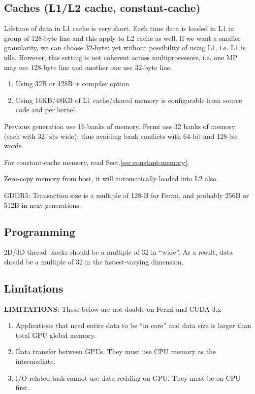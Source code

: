 \subsection{Caches (L1/L2 cache, constant-cache)}
\label{sec:caches}

Lifetime of data in L1 cache is very short. Each time data is loaded
in L1 in group of 128-byte line and this apply to L2 cache as well. If
we want a smaller granularity, we can choose 32-byte; yet without
possibility of using L1, i.e. L1 is idle. However, this setting is not
coherent across multiprocessors, i.e. one MP may use 128-byte line and
another one use 32-byte line. 
\begin{enumerate}
\item Using 32B or 128B is compiler option
\item Using 16KB/48KB of L1 cache/shared memory is configurable from
  source code and per kernel. 
\end{enumerate}

Previous generation use 16 banks of memory. Fermi use 32 banks of
memory (each with 32-bits wide); thus avoiding bank conflicts with
64-bit and 128-bit words.

For constant-cache memory, read Sect.\ref{sec:constant-memory}.

Zero-copy memory from host, it will automatically loaded into L2
also. 

GDDR5: Transaction size is a multiple of 128-B for Fermi, and probably 256B
or 512B in next generations.

\subsection{Programming}
\label{sec:programming}

2D/3D thread blocks should be a multiple of 32 in ``wide''. As a
result, data should be a multiple of 32 in the fastest-varying
dimension. 


\subsection{Limitations}
\label{sec:Limitation}

{\bf LIMITATIONS}: These below are not doable on Fermi and CUDA 3.x
\begin{enumerate}
\item Applications that need entire data to be ``in
core'' and data size is larger than total GPU global memory.

\item Data transfer between GPUs. They must use CPU memory as the
  intermediate. 

\item I/O related task cannot use data residing on GPU. They must be
  on CPU first.
\end{enumerate}

